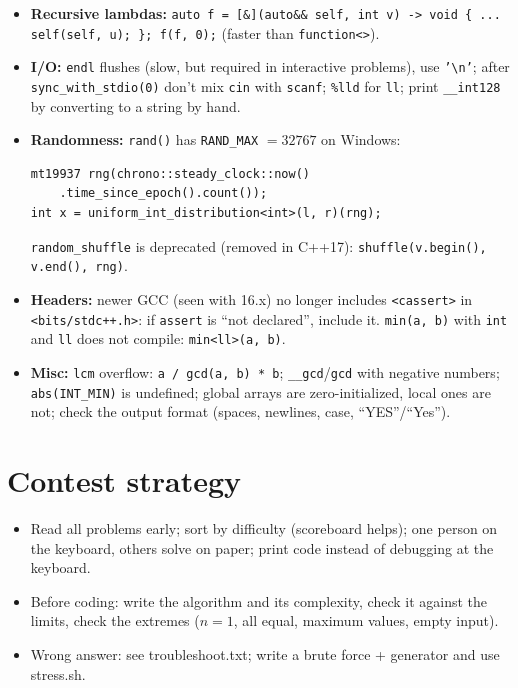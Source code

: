 \begin{itemize}
	\item \textbf{Recursive lambdas:} \texttt{auto f = [\&](auto\&\& self, int v) -> void \{ ... self(self, u); \};
		f(f, 0);} (faster than \texttt{function<>}).
	\item \textbf{I/O:} \texttt{endl} flushes (slow, but required in interactive problems), use
		\texttt{'\textbackslash n'}; after \texttt{sync\_with\_stdio(0)} don't mix \texttt{cin} with \texttt{scanf};
		\texttt{\%lld} for \texttt{ll}; print \texttt{\_\_int128} by converting to a string by hand.
	\item \textbf{Randomness:} \texttt{rand()} has \texttt{RAND\_MAX} $= 32767$ on Windows:
\begin{lstlisting}
mt19937 rng(chrono::steady_clock::now()
	.time_since_epoch().count());
int x = uniform_int_distribution<int>(l, r)(rng);
\end{lstlisting} \texttt{random\_shuffle} is deprecated (removed in C++17):
		\texttt{shuffle(v.begin(), v.end(), rng)}.
	\item \textbf{Headers:} newer GCC (seen with 16.x) no longer includes \texttt{<cassert>} in
		\texttt{<bits/stdc++.h>}: if \texttt{assert} is ``not declared'', include it.
		\texttt{min(a, b)} with \texttt{int} and \texttt{ll} does not compile: \texttt{min<ll>(a, b)}.
	\item \textbf{Misc:} \texttt{lcm} overflow: \texttt{a / gcd(a, b) * b}; \texttt{\_\_gcd}/\texttt{gcd} with
		negative numbers; \texttt{abs(INT\_MIN)} is undefined; global arrays are zero-initialized, local ones
		are not; check the output format (spaces, newlines, case, ``YES''/``Yes'').
\end{itemize}

\section{Contest strategy}
\begin{itemize}
	\item Read all problems early; sort by difficulty (scoreboard helps); one person on the keyboard,
		others solve on paper; print code instead of debugging at the keyboard.
	\item Before coding: write the algorithm and its complexity, check it against the limits,
		check the extremes ($n = 1$, all equal, maximum values, empty input).
	\item Wrong answer: see troubleshoot.txt; write a brute force + generator and use stress.sh.
\end{itemize}
